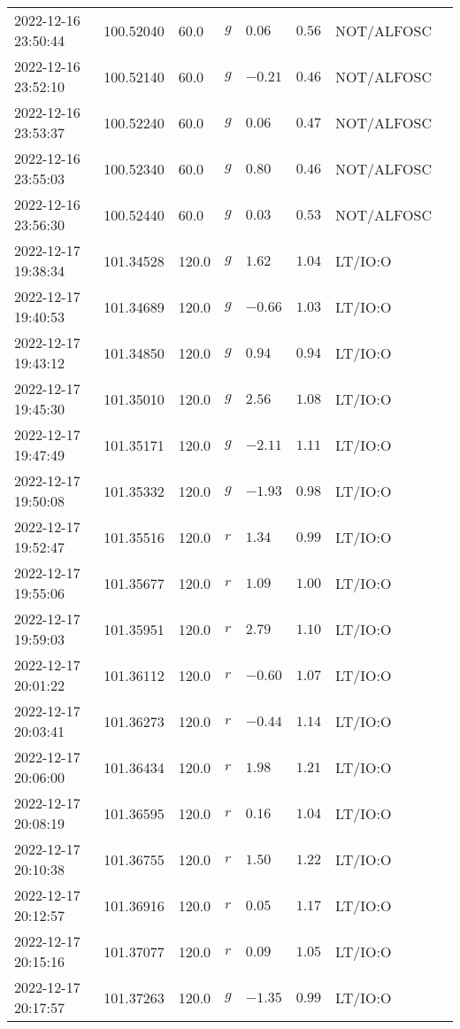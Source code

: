 \documentclass{nature_plusfigure}
\begin{document}
\begin{supplement}
\begin{center}
\begin{longtable}{llllllll}
2022-12-16 23:50:44 & 100.52040 & 60.0 & $g$ & $0.06$ & $0.56$ & NOT/ALFOSC &  \\ 
2022-12-16 23:52:10 & 100.52140 & 60.0 & $g$ & $-0.21$ & $0.46$ & NOT/ALFOSC &  \\ 
2022-12-16 23:53:37 & 100.52240 & 60.0 & $g$ & $0.06$ & $0.47$ & NOT/ALFOSC &  \\ 
2022-12-16 23:55:03 & 100.52340 & 60.0 & $g$ & $0.80$ & $0.46$ & NOT/ALFOSC &  \\ 
2022-12-16 23:56:30 & 100.52440 & 60.0 & $g$ & $0.03$ & $0.53$ & NOT/ALFOSC &  \\ 
2022-12-17 19:38:34 & 101.34528 & 120.0 & $g$ & $1.62$ & $1.04$ & LT/IO:O &  \\ 
2022-12-17 19:40:53 & 101.34689 & 120.0 & $g$ & $-0.66$ & $1.03$ & LT/IO:O &  \\ 
2022-12-17 19:43:12 & 101.34850 & 120.0 & $g$ & $0.94$ & $0.94$ & LT/IO:O &  \\ 
2022-12-17 19:45:30 & 101.35010 & 120.0 & $g$ & $2.56$ & $1.08$ & LT/IO:O &  \\ 
2022-12-17 19:47:49 & 101.35171 & 120.0 & $g$ & $-2.11$ & $1.11$ & LT/IO:O &  \\ 
2022-12-17 19:50:08 & 101.35332 & 120.0 & $g$ & $-1.93$ & $0.98$ & LT/IO:O &  \\ 
2022-12-17 19:52:47 & 101.35516 & 120.0 & $r$ & $1.34$ & $0.99$ & LT/IO:O &  \\ 
2022-12-17 19:55:06 & 101.35677 & 120.0 & $r$ & $1.09$ & $1.00$ & LT/IO:O &  \\ 
2022-12-17 19:59:03 & 101.35951 & 120.0 & $r$ & $2.79$ & $1.10$ & LT/IO:O &  \\ 
2022-12-17 20:01:22 & 101.36112 & 120.0 & $r$ & $-0.60$ & $1.07$ & LT/IO:O &  \\ 
2022-12-17 20:03:41 & 101.36273 & 120.0 & $r$ & $-0.44$ & $1.14$ & LT/IO:O &  \\ 
2022-12-17 20:06:00 & 101.36434 & 120.0 & $r$ & $1.98$ & $1.21$ & LT/IO:O &  \\ 
2022-12-17 20:08:19 & 101.36595 & 120.0 & $r$ & $0.16$ & $1.04$ & LT/IO:O &  \\ 
2022-12-17 20:10:38 & 101.36755 & 120.0 & $r$ & $1.50$ & $1.22$ & LT/IO:O &  \\ 
2022-12-17 20:12:57 & 101.36916 & 120.0 & $r$ & $0.05$ & $1.17$ & LT/IO:O &  \\ 
2022-12-17 20:15:16 & 101.37077 & 120.0 & $r$ & $0.09$ & $1.05$ & LT/IO:O &  \\ 
2022-12-17 20:17:57 & 101.37263 & 120.0 & $g$ & $-1.35$ & $0.99$ & LT/IO:O &  \\ 

\end{longtable}
\end{center}
\end{supplement}
\end{document}
